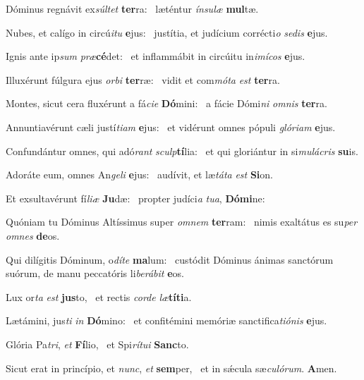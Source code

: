 \item Dóminus regnávit ex\textit{súltet} \textbf{ter}ra:~\psstar{} læténtur \textit{ínsulæ} \textbf{mul}tæ.
\item Nubes, et calígo in circú\textit{itu} \textbf{e}jus:~\psstar{} justítia, et judícium corrécti\textit{o} \textit{sedis} \textbf{e}jus.
\item Ignis ante ip\textit{sum} \textit{præ}\textbf{cé}det:~\psstar{} et inflammábit in circúitu in\textit{imícos} \textbf{e}jus.
\item Illuxérunt fúlgura ejus \textit{orbi} \textbf{ter}ræ:~\psstar{} vidit et com\textit{móta} \textit{est} \textbf{ter}ra.
\item Montes, sicut cera fluxérunt a fá\textit{cie} \textbf{Dó}mini:~\psstar{} a fácie Dómi\textit{ni} \textit{omnis} \textbf{ter}ra.
\item Annuntiavérunt cæli justí\textit{tiam} \textbf{e}jus:~\psstar{} et vidérunt omnes pópuli \textit{glóriam} \textbf{e}jus.
\item Confundántur omnes, qui adó\textit{rant} \textit{sculp}\textbf{tí}lia:~\psstar{} et qui gloriántur in si\textit{mulácris} \textbf{su}is.
\item Adoráte eum, omnes An\textit{geli} \textbf{e}jus:~\psstar{} audívit, et læ\textit{táta} \textit{est} \textbf{Si}on.
\item Et exsultavérunt fí\textit{liæ} \textbf{Ju}dæ:~\psstar{} propter judíci\textit{a} \textit{tua}, \textbf{Dó}\textbf{mi}ne:
\item Quóniam tu Dóminus Altíssimus super \textit{omnem} \textbf{ter}ram:~\psstar{} nimis exaltátus es su\textit{per} \textit{omnes} \textbf{de}os.
\item Qui dilígitis Dóminum, o\textit{díte} \textbf{ma}lum:~\psstar{} custódit Dóminus ánimas sanctórum suórum, de manu peccatóris li\textit{berábit} \textbf{e}os.
\item Lux or\textit{ta} \textit{est} \textbf{jus}to,~\psstar{} et rectis \textit{corde} \textit{læ}\textbf{tí}\textbf{ti}a.
\item Lætámini, jus\textit{ti} \textit{in} \textbf{Dó}mino:~\psstar{} et confitémini memóriæ sanctifica\textit{tiónis} \textbf{e}jus.
\item Glória Pa\textit{tri}, \textit{et} \textbf{Fí}lio,~\psstar{} et Spi\textit{rítui} \textbf{Sanc}to.
\item Sicut erat in princípio, et \textit{nunc}, \textit{et} \textbf{sem}per,~\psstar{} et in sǽcula sæ\textit{culórum}. \textbf{A}men.
